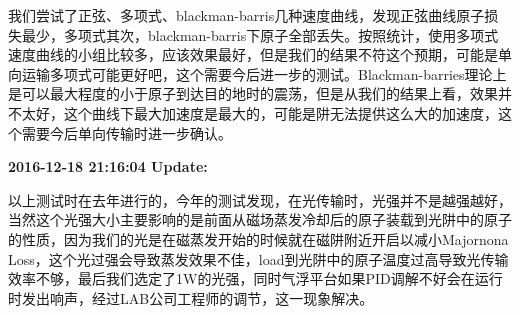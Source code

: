 \documentclass[onecolumn,a4paper,10pt]{article}
\begin{document}
我们尝试了正弦、多项式、blackman-barris几种速度曲线，发现正弦曲线原子损失最少，多项式其次，blackman-barris下原子全部丢失。按照统计，使用多项式速度曲线的小组比较多，应该效果最好，但是我们的结果不符这个预期，可能是单向运输多项式可能更好吧，这个需要今后进一步的测试。Blackman-barries理论上是可以最大程度的小于原子到达目的地时的震荡，但是从我们的结果上看，效果并不太好，这个曲线下最大加速度是最大的，可能是阱无法提供这么大的加速度，这个需要今后单向传输时进一步确认。

\textbf{2016-12-18 21:16:04 Update:}

以上测试时在去年进行的，今年的测试发现，在光传输时，光强并不是越强越好，当然这个光强大小主要影响的是前面从磁场蒸发冷却后的原子装载到光阱中的原子的性质，因为我们的光是在磁蒸发开始的时候就在磁阱附近开启以减小Majornona Loss，这个光过强会导致蒸发效果不佳，load到光阱中的原子温度过高导致光传输效率不够，最后我们选定了1W的光强，同时气浮平台如果PID调解不好会在运行时发出响声，经过LAB公司工程师的调节，这一现象解决。







\small


\end{document}
